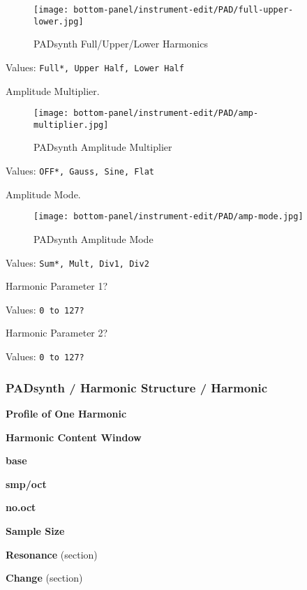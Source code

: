 \begin{figure}[H]
   \centering 
   \texttt{[image: bottom-panel/instrument-edit/PAD/full-upper-lower.jpg]}
   \caption{PADsynth Full/Upper/Lower Harmonics}
   \label{fig:padsynth_full_upper_lower}
\end{figure}

   Values: \texttt{Full*, Upper Half, Lower Half}

   Amplitude Multiplier.

\begin{figure}[H]
   \centering 
   \texttt{[image: bottom-panel/instrument-edit/PAD/amp-multiplier.jpg]}
   \caption{PADsynth Amplitude Multiplier}
   \label{fig:padsynth_amplitude_multiplier}
\end{figure}

   Values: \texttt{OFF*, Gauss, Sine, Flat}

   Amplitude Mode.

\begin{figure}[H]
   \centering 
   \texttt{[image: bottom-panel/instrument-edit/PAD/amp-mode.jpg]}
   \caption{PADsynth Amplitude Mode}
   \label{fig:padsynth_amplitude_mode}
\end{figure}

   Values: \texttt{Sum*, Mult, Div1, Div2}

   Harmonic Parameter 1?

   Values: \texttt{0 to 127?}

   Harmonic Parameter 2?

   Values: \texttt{0 to 127?}

\subsubsection{PADsynth / Harmonic Structure / Harmonic}
\label{subsubsec:padsynth_harmonic_structure_harmonic}

   \begin{enumber}
      \item \textbf{Profile of One Harmonic}
      \item \textbf{Harmonic Content Window}
      \item \textbf{base}
      \item \textbf{smp/oct}
      \item \textbf{no.oct}
      \item \textbf{Sample Size}
      \item \textbf{Resonance} (section)
      \item \textbf{Change} (section)
   \end{enumber}

